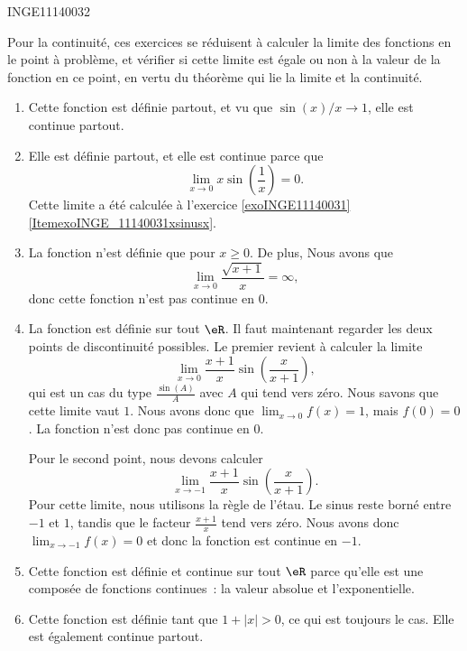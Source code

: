 

\begin{corrige}{INGE11140032}

	Pour la continuité, ces exercices se réduisent à calculer la limite des fonctions en le point à problème, et vérifier si cette limite est égale ou non à la valeur de la fonction en ce point, en vertu du théorème qui lie la limite et la continuité.

	\begin{enumerate}

		\item
			Cette fonction est définie partout, et vu que $\sin(x)/x\to 1$, elle est continue partout.
		\item
			Elle est définie partout, et elle est continue parce que 
			\begin{equation}
				\lim_{x\to 0} x\sin(\frac{1}{ x })=0.
			\end{equation}
			Cette limite a été calculée à l'exercice \ref{exoINGE11140031}\ref{ItemexoINGE_11140031xsinusx}.
		\item
			La fonction n'est définie que pour $x\geq 0$. De plus,
			Nous avons que 
			\begin{equation}
				\lim_{x\to 0} \frac{ \sqrt{x+1} }{ x }=\infty,
			\end{equation}
			donc cette fonction n'est pas continue en $0$. 

		\item
			La fonction est définie sur tout $\eR$. Il faut maintenant regarder les deux points de discontinuité possibles. Le premier revient à calculer la limite
			\begin{equation}
				\lim_{x\to 0} \frac{ x+1 }{ x }\sin\left( \frac{ x }{ x+1 } \right),
			\end{equation}
			qui est un cas du type $\frac{ \sin(A) }{ A }$ avec $A$ qui tend vers zéro. Nous savons que cette limite vaut $1$. Nous avons donc que $\lim_{x\to 0} f(x)=1$, mais $f(0)=0$. La fonction n'est donc pas continue en $0$.

			Pour le second point, nous devons calculer
			\begin{equation}
				\lim_{x\to -1} \frac{ x+1 }{ x }\sin\left( \frac{ x }{ x+1 } \right).
			\end{equation}
			Pour cette limite, nous utilisons la règle de l'étau. Le sinus reste borné entre $-1$ et $1$, tandis que le facteur $\frac{ x+1 }{ x }$ tend vers zéro. Nous avons donc $\lim_{x\to -1} f(x)=0$ et donc la fonction est continue en $-1$.

		\item
			Cette fonction est définie et continue sur tout $\eR$ parce qu'elle est une composée de fonctions continues~: la valeur absolue et l'exponentielle.

		\item
			Cette fonction est définie tant que $1+| x |>0$, ce qui est toujours le cas. Elle est également continue partout.
			
	\end{enumerate}

\end{corrige}
